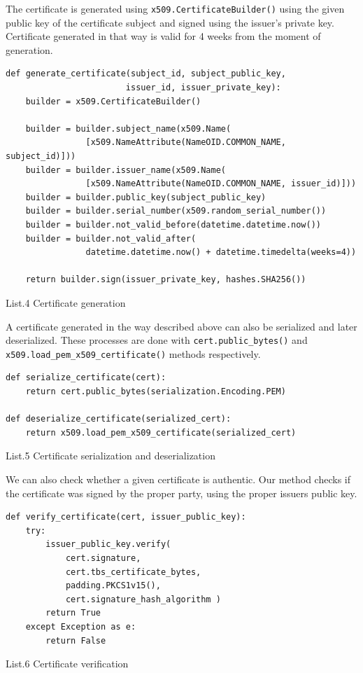 \documentclass[12pt, a4paper]{report}
\begin{document}
The certificate is generated using \texttt{x509.CertificateBuilder()} using the given public key of the certificate subject and signed using the issuer's private key. Certificate generated in that way is valid for 4 weeks from the moment of generation.
\begin{verbatim}
def generate_certificate(subject_id, subject_public_key,
                        issuer_id, issuer_private_key):
    builder = x509.CertificateBuilder()

    builder = builder.subject_name(x509.Name(
                [x509.NameAttribute(NameOID.COMMON_NAME, subject_id)]))
    builder = builder.issuer_name(x509.Name(
                [x509.NameAttribute(NameOID.COMMON_NAME, issuer_id)]))
    builder = builder.public_key(subject_public_key)
    builder = builder.serial_number(x509.random_serial_number())
    builder = builder.not_valid_before(datetime.datetime.now())
    builder = builder.not_valid_after(
                datetime.datetime.now() + datetime.timedelta(weeks=4))

    return builder.sign(issuer_private_key, hashes.SHA256())
\end{verbatim}
\begin{center}
List.4 Certificate generation
\end{center}

\noindent
A certificate generated in the way described above can also be serialized and later deserialized. These processes are done with \texttt{cert.public_bytes()} and\\  \texttt{x509.load_pem_x509_certificate()} methods respectively.

\begin{verbatim}
def serialize_certificate(cert):
    return cert.public_bytes(serialization.Encoding.PEM)

def deserialize_certificate(serialized_cert):
    return x509.load_pem_x509_certificate(serialized_cert)
\end{verbatim}
\begin{center}
List.5 Certificate serialization and deserialization
\end{center}

\noindent
We can also check whether a given certificate is authentic. Our method checks if the certificate was signed by the proper party, using the proper issuers public key.
\begin{verbatim}
def verify_certificate(cert, issuer_public_key):
    try:
        issuer_public_key.verify(
            cert.signature,
            cert.tbs_certificate_bytes,
            padding.PKCS1v15(),
            cert.signature_hash_algorithm )
        return True
    except Exception as e:
        return False
\end{verbatim}
\begin{center}
List.6 Certificate verification
\end{center}
\end{document}
